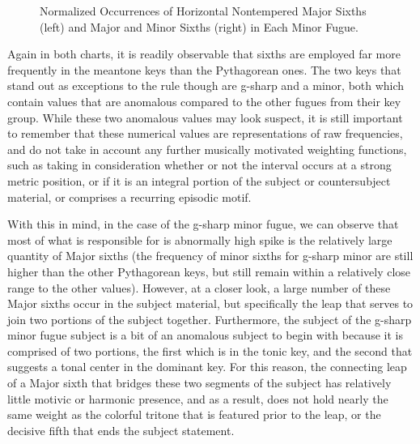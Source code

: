 \begin{figure}[H]
\vspace{1.5em}
    \centering
    \caption[Normalized Occurrences of Horizontal Nontempered Sixths in Each Minor Fugue. ]{Normalized Occurrences of Horizontal Nontempered Major Sixths (left) and Major and Minor Sixths (right) in Each Minor Fugue.}
\end{figure}    Again in both charts, it is readily observable that sixths are employed
far more frequently in the meantone keys than the Pythagorean ones. The
two keys that stand out as exceptions to the rule though are g-sharp and
a minor, both which contain values that are anomalous compared to the
other fugues from their key group. While these two anomalous values may
look suspect, it is still important to remember that these numerical
values are representations of raw frequencies, and do not take in
account any further musically motivated weighting functions, such as
taking in consideration whether or not the interval occurs at a strong
metric position, or if it is an integral portion of the subject or
countersubject material, or comprises a recurring episodic motif.

With this in mind, in the case of the g-sharp minor fugue, we can
observe that most of what is responsible for is abnormally high spike is
the relatively large quantity of Major sixths (the frequency of minor
sixths for g-sharp minor are still higher than the other Pythagorean
keys, but still remain within a relatively close range to the other
values). However, at a closer look, a large number of these Major sixths
occur in the subject material, but specifically the leap that serves to
join two portions of the subject together. Furthermore, the subject of
the g-sharp minor fugue subject is a bit of an anomalous subject to
begin with because it is comprised of two portions, the first which is
in the tonic key, and the second that suggests a tonal center in the
dominant key. For this reason, the connecting leap of a Major sixth that
bridges these two segments of the subject has relatively little motivic
or harmonic presence, and as a result, does not hold nearly the same
weight as the colorful tritone that is featured prior to the leap, or
the decisive fifth that ends the subject statement.


    \begin{center}
    \end{center}
    


